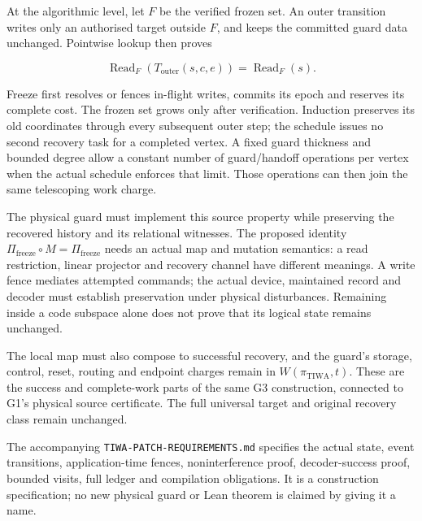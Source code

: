 \documentclass[
]{article}
\begin{document}
At the algorithmic level, let \(F\) be the verified frozen set. An outer
transition writes only an authorised target outside \(F\), and keeps the
committed guard data unchanged. Pointwise lookup then proves

\[
\operatorname{Read}_{F}(T_{\mathrm{outer}}(s,c,e))
=\operatorname{Read}_{F}(s).
\]

Freeze first resolves or fences in-flight writes, commits its epoch and
reserves its complete cost. The frozen set grows only after
verification. Induction preserves its old coordinates through every
subsequent outer step; the schedule issues no second recovery task for a
completed vertex. A fixed guard thickness and bounded degree allow a
constant number of guard/handoff operations per vertex when the actual
schedule enforces that limit. Those operations can then join the same
telescoping work charge.

The physical guard must implement this source property while preserving
the recovered history and its relational witnesses. The proposed
identity \(\Pi_{\mathrm{freeze}}\circ M=\Pi_{\mathrm{freeze}}\) needs an
actual map and mutation semantics: a read restriction, linear projector
and recovery channel have different meanings. A write fence mediates
attempted commands; the actual device, maintained record and decoder
must establish preservation under physical disturbances. Remaining
inside a code subspace alone does not prove that its logical state
remains unchanged.

The local map must also compose to successful recovery, and the guard's
storage, control, reset, routing and endpoint charges remain in
\(W(\pi_{\mathrm{TIWA}},t)\). These are the success and complete-work
parts of the same G3 construction, connected to G1's physical source
certificate. The full universal target and original recovery class
remain unchanged.

The accompanying
\texttt{T\allowbreak{}I\allowbreak{}W\allowbreak{}A\allowbreak{}-\allowbreak{}P\allowbreak{}A\allowbreak{}T\allowbreak{}C\allowbreak{}H\allowbreak{}-\allowbreak{}R\allowbreak{}E\allowbreak{}Q\allowbreak{}U\allowbreak{}I\allowbreak{}R\allowbreak{}E\allowbreak{}M\allowbreak{}E\allowbreak{}N\allowbreak{}T\allowbreak{}S\allowbreak{}.\allowbreak{}m\allowbreak{}d}
specifies the actual state, event transitions, application-time fences,
noninterference proof, decoder-success proof, bounded visits, full
ledger and compilation obligations. It is a construction specification;
no new physical guard or Lean theorem is claimed by giving it a name.
\end{document}
